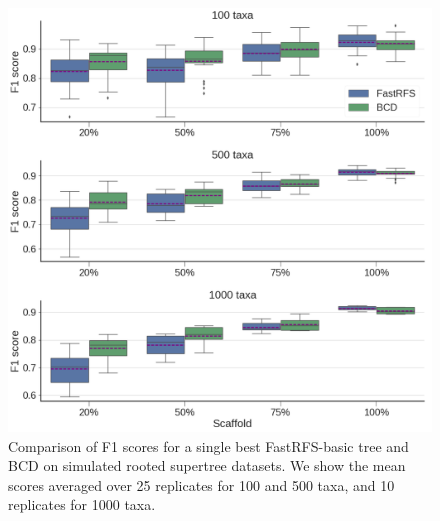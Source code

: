 \begin{figure}
  \centering
  \includegraphics[width=\textwidth]{siesta-supp-figs/fastrfs_basic_smidgenOG_f1}
  \caption[Comparison of F1 scores for a single best FastRFS-basic tree
    and BCD on simulated rooted supertree datasets.]{Comparison of F1 scores for a single best FastRFS-basic tree
    and BCD on simulated rooted supertree datasets. We show the mean
    scores averaged over 25 replicates for 100 and 500 taxa, and 10
    replicates for 1000 taxa.}
  \label{fig:supertree-consensus-comparison-4}
\end{figure}

